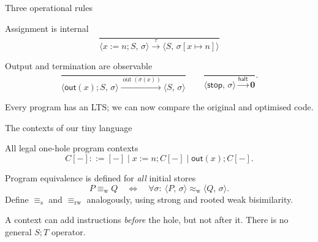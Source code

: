 \documentclass[handout,aspectratio=169,11pt]{beamer}
\newcommand{\step}[1]{\xrightarrow{#1}}
\newcommand{\wb}{\mathrel{\approx_{\mathrm w}}}
\newcommand{\nil}{\mathbf 0}
\newcommand{\Takeaway}[1]{\begin{exampleblock}{}#1\end{exampleblock}}
\newcommand{\Store}[2]{\langle #1,\,#2\rangle}
\begin{document}
\begin{frame}{Three operational rules}
  \begin{block}{Assignment is internal}
    \[
      \frac{}{
       \Store{x:=n;S}{\sigma}\step{\tau}
       \Store{S}{\sigma[x\mapsto n]}}
    \]
  \end{block}
  \begin{block}{Output and termination are observable}
    \[
      \frac{}{\Store{\mathsf{out}(x);S}{\sigma}
      \step{\operatorname{out}(\sigma(x))}\Store{S}{\sigma}}
      \qquad
      \frac{}{\Store{\mathsf{stop}}{\sigma}\step{\mathsf{halt}}\nil}.
    \]
  \end{block}
  \Takeaway{Every program has an LTS; we can now compare the original and optimised code.}
\end{frame}

\begin{frame}{The contexts of our tiny language}
  \begin{block}{All legal one-hole program contexts}
    \[
       C[-] ::= [-]
       \mid x:=n;C[-]
       \mid \mathsf{out}(x);C[-].
    \]
  \end{block}
  \begin{block}{Program equivalence is defined for \emph{all} initial stores}
    \[
      P\equiv_{\mathrm w}Q
      \quad\Longleftrightarrow\quad
      \forall\sigma:\ \Store{P}{\sigma}\wb\Store{Q}{\sigma}.
    \]
    Define $\equiv_{\mathrm s}$ and $\equiv_{\mathrm{rw}}$ analogously,
    using strong and rooted weak bisimilarity.
  \end{block}
  \Takeaway{A context can add instructions \emph{before} the hole, but not after it. There is no general $S;T$ operator.}
\end{frame}
\end{document}
